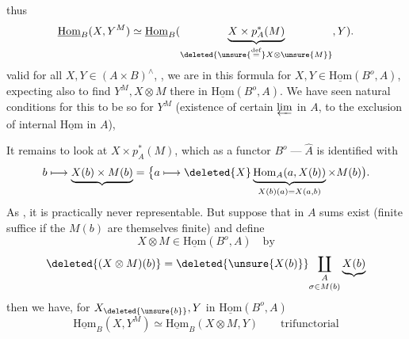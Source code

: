 thus
\[
\underline{\mathrm{Hom}}_B(X,Y^M)\simeq\underline{\mathrm{Hom}}_B(\underbrace{X\times p_A^*(M)}_{\deleted{\unsure{\mathop{=}\limits^{\mathrm{def}}}X\otimes\unsure{M}}},Y).
\]
 valid for all $X,Y\in(A\times B)^\wedge$, , we are  in this formula for $X,Y\in\underline{\mathrm{Hom}}(B^o,A)$, expecting also to find $Y^M,X\otimes M$ there in $\underline{\mathrm{Hom}}(B^o,A)$. We have seen natural conditions for this to be so for $Y^M$ (existence of certain $\varprojlim$ in $A$, to the exclusion of internal $\underline{\mathrm{Hom}}$ in $A$),

It remains to look at $X\times p_A^*(M)$, which as a functor $B^o\mathbin{\text{---}}\widehat A$ is identified with
\[
b\longmapsto\underbrace{X(b)\times M(b)}=\bigl\{a\longmapsto\deleted{X}\underbrace{\mathrm{Hom}_A(a,X(b))}_{X(b)(a)=X(a,b)}\times M(b)\bigr).
\]
As , it is practically never representable. But suppose that in $A$ sums exist (finite  suffice if the $M(b)$ are themselves finite) and define
\[
X\otimes M\in\underline{\mathrm{Hom}}(B^o,A)\quad\text{by}
\]
\[
\deleted{(X\otimes M)(b)}=\deleted{\unsure{X(b)}}\underset{\sigma\in M(b)}{\coprod_A}\underbrace{X(b)}
\]
then we have, for $X_{\deleted{\unsure{b}}},Y$ in $\underline{\mathrm{Hom}}(B^o,A)$
\[
\underline{\mathrm{Hom}}_B(X,Y^M)\simeq\underline{\mathrm{Hom}}_B(X\otimes M,Y)\qquad\text{trifunctorial}
\]
